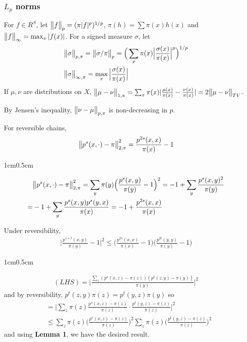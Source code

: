 \documentclass[12pt,a4paper]{article}
\newenvironment{proof}
{\begin{changemargin}{1cm}{0.5cm} 
	}%
	{\end{changemargin}
}
\newenvironment{p}
{\begin{proof} 
	}%
	{\end{proof}
}
\begin{document}
\subsubsection*{$L_p$ norms}
For $f\in R^S$, let $\bigl\lVert f\bigr\rVert_{p} = (\pi |f|^p)^{1/p}$, $\pi(h) = \sum \pi(x) h(x)$ and $\bigl\lVert f\bigr\rVert_{\infty} = \max_x |f(x)|$. For a signed measure $\sigma$, let
\begin{align*}
&\bigl\lVert\sigma\bigr\rVert_{p, \pi} = \bigl\lVert\sigma/\pi\bigr\rVert_{p} = \Big( \sum_x \pi(x) \Big|\frac{\sigma(x)}{\pi(x)}\Big|^p\Big)^{1/p} \\
&\bigl\lVert\sigma\bigr\rVert_{\infty, \pi} = \max_x \Big|\frac{\sigma(x)}{\pi(x)}\Big|
\end{align*}
If $\mu, \nu$ are distributions on $X$, $\bigl\lVert\mu - \nu\bigr\rVert_{1, \pi} = \sum_{x} \pi (x) |\frac{\mu(x)}{\pi(x)} - \frac{\nu(x)}{\pi(x)}| = 2\bigl\lVert\mu -\nu\bigr\rVert_{TV}$.

\quad By Jensen's inequality, $\bigl\lVert\nu - \mu\bigr\rVert_{p, \pi}$ is non-decreasing in $p$.
\s

 For reversible chains,
\begin{align*}
\bigl\lVert p^s(x, \cdot) - \pi\bigr\rVert_{2, \pi}^2 = \frac{p^{2s}(x,x)}{\pi(x)}-1
\end{align*}
\begin{p}
\pf \begin{align*}
&\bigl\lVert p^s(x, \cdot) - \pi\bigr\rVert_{2, \pi}^2 =\sum_y \pi(y) \Big(\frac{p^s(x,y)}{\pi(y)}-1 \Big)^2 = -1 + \sum_y \frac{p^s(x,y)^2}{\pi(y)} \\
=& -1 + \sum_{y} \frac{p^s(x,y)p^s(y,x)}{\pi(x)} = -1 +\frac{p^{2s}(x,x)}{\pi(x)}
\end{align*}
\eop
\end{p}
\s

 Under reversibility,
\begin{align*}
\Big| \frac{p^{s+t}(x,y)}{\pi(y)} -1 \Big|^2 \leq \Big( \frac{p^{2s}(x,x)}{\pi(x)} -1\Big) \Big(\frac{p^{2t}(y,y)}{\pi(y)} -1\Big)
\end{align*}
\begin{p}
\pf \begin{align*}
(LHS) = \Big|\frac{\sum_{z}(p^s(x,z)- \pi(z))(p^t(z,y)- \pi(y))}{\pi(y)}  \Big|^2
\end{align*}
and by reversibility, $p^t(z,y)\pi(z) = p^t(y,z) \pi(y)$ so
\begin{align*}
&=\Big| \sum_{z} \pi(z) \frac{ p^s(x,z) - \pi(z)}{\pi(z)} \cdot \frac{p^t(y,z) - \pi(z)}{\pi(z)} \Big|^2 \\
&\leq \sum_{z} \pi(z) \Big( \frac{p^s(x,z) - \pi(z)}{\pi(z)}\Big)^2 \sum_z \pi(z) \Big( \frac{p^t(y,z)- \pi(z)}{\pi(z)}\Big)^2 
\end{align*}
and using \textbf{Lemma 1}, we have the desired result.
\end{p}
\s
\end{document}
